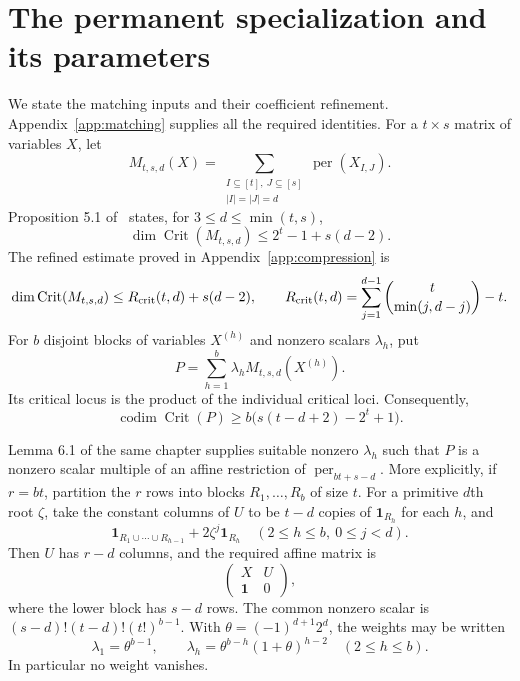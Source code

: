 \documentclass[11pt]{article}
\theoremstyle{remark}\newtheorem{remark}[theorem]{Remark}
\DeclareMathOperator{\per}{per}
\DeclareMathOperator{\Crit}{Crit}
\DeclareMathOperator{\codim}{codim}
\begin{document}
\section{The permanent specialization and its parameters}

We state the matching inputs and their coefficient refinement.
Appendix~\ref{app:matching} supplies all the required identities.
For a $t\times s$ matrix
of variables $X$, let
\[
 M_{t,s,d}(X)=\sum_{\substack{I\subseteq[t],\ J\subseteq[s]\\
                              |I|=|J|=d}}
                 \per(X_{I,J}).
\]
Proposition 5.1 of~\cite[Chapter 5]{OAI} states, for
$3\le d\le\min(t,s)$,
\begin{equation}\label{eq:critical}
 \dim\Crit(M_{t,s,d})\le 2^t-1+s(d-2).
\end{equation}
The refined estimate proved in Appendix~\ref{app:compression} is
\begin{equation}\label{eq:critical-compressed}
 \dim\Crit(M_{t,s,d})\le R_{\rm crit}(t,d)+s(d-2),\qquad
 R_{\rm crit}(t,d)=\sum_{j=1}^{d-1}\binom{t}{\min(j,d-j)}-t.
\end{equation}
For $b$ disjoint blocks of variables $X^{(h)}$ and nonzero scalars
$\lambda_h$, put
\[
P=\sum_{h=1}^b\lambda_h M_{t,s,d}(X^{(h)}).
\]
Its critical locus is the product of the
individual critical loci. Consequently,
\begin{equation}\label{eq:codimension}
 \codim\Crit(P)\ge b\bigl(s(t-d+2)-2^t+1\bigr).
\end{equation}

Lemma 6.1 of the same chapter supplies suitable nonzero $\lambda_h$
such that $P$ is a nonzero scalar multiple of an affine restriction
of $\per_{bt+s-d}$. More explicitly, if $r=bt$, partition the $r$
rows into blocks $R_1,\ldots,R_b$ of size $t$. For a primitive $d$th
root $\zeta$, take the constant columns of $U$ to be $t-d$ copies of
$\mathbf1_{R_h}$ for each $h$, and
\[
 \mathbf1_{R_1\cup\cdots\cup R_{h-1}}+2\zeta^j\mathbf1_{R_h}
 \quad(2\le h\le b,\ 0\le j<d).
\]
Then $U$ has $r-d$ columns, and the required affine matrix is
\[
 \begin{pmatrix}X&U\\ \mathbf1&0\end{pmatrix},
\]
where the lower block has $s-d$ rows. The common nonzero scalar is
$(s-d)!(t-d)!(t!)^{b-1}$. With
$\theta=(-1)^{d+1}2^d$, the weights may be written
\[
 \lambda_1=\theta^{b-1},\qquad
 \lambda_h=\theta^{b-h}(1+\theta)^{h-2}\quad(2\le h\le b).
\]
In particular no weight vanishes.
\end{document}
